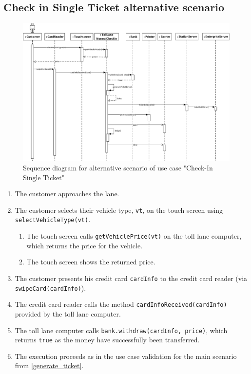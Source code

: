 \subsection{Check in Single Ticket alternative scenario}

\begin{figure}[H]
\centerline{\includegraphics[width=1.4\columnwidth]{"img/sequence_diagrams/sequence_diagram_single_ticket_check_in_card"}}
\caption{Sequence diagram for alternative scenario of use case "Check-In Single Ticket"}
\label{fig:seq_single_ticket_alt}
\end{figure}

\begin{enumerate}
\item The customer approaches the lane.
\item The customer selects their vehicle type, \texttt{vt}, on the touch screen using \texttt{selectVehicleType(vt)}.
	\begin{enumerate}
	\item The touch screen calls \texttt{getVehiclePrice(vt)} on the toll lane computer, which returns the price for the vehicle.
	\item The touch screen shows the returned price.
	\end{enumerate}
\item The customer presents his credit card \texttt{cardInfo} to the credit card reader (via \texttt{swipeCard(cardInfo)}).
	\item The credit card reader calls the method \texttt{cardInfoReceived(cardInfo)} provided by the toll lane computer.
		\item The toll lane computer calls \texttt{bank.withdraw(cardInfo, price)}, which returns \texttt{true} as the money have successfully been transferred.
		\item The execution proceeds as in the use case validation for the main scenario from \autoref{generate_ticket}.
		
	
\end{enumerate}